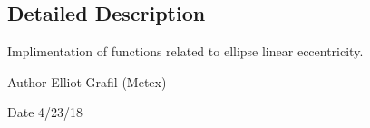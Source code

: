\subsection{Detailed Description}
Implimentation of functions related to ellipse linear eccentricity. 

\begin{DoxyAuthor}{Author}
Elliot Grafil (Metex) 
\end{DoxyAuthor}
\begin{DoxyDate}{Date}
4/23/18 
\end{DoxyDate}
